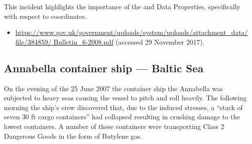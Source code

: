 This incident highlights the importance of the  and  Data Properties, specifically with respect to coordinates.

\begin{samepage}
\begin{itemize}
  \item \raggedright{\href{https://www.gov.uk/government/uploads/system/uploads/attachment_data/file/384859/Bulletin_6-2008.pdf}{https://www.gov.uk/government/uploads/system/uploads/attachment\_data/file/384859/ Bulletin\_6-2008.pdf} (accessed 29 November 2017).}
\end{itemize}
\end{samepage}

\subsection{Annabella container ship --- Baltic Sea} \label{bkm:incacc:annabella}
On the evening of the 25 June 2007 the container ship the Annabella was subjected to heavy seas causing the vessel to pitch and roll heavily. The following morning the ship’s crew discovered that, due to the induced stresses, a ``stack of seven 30 ft cargo containers'' had collapsed resulting in crushing damage to the lowest containers. A number of these containers were transporting Class 2 Dangerous Goods in the form of Butylene gas.
 
